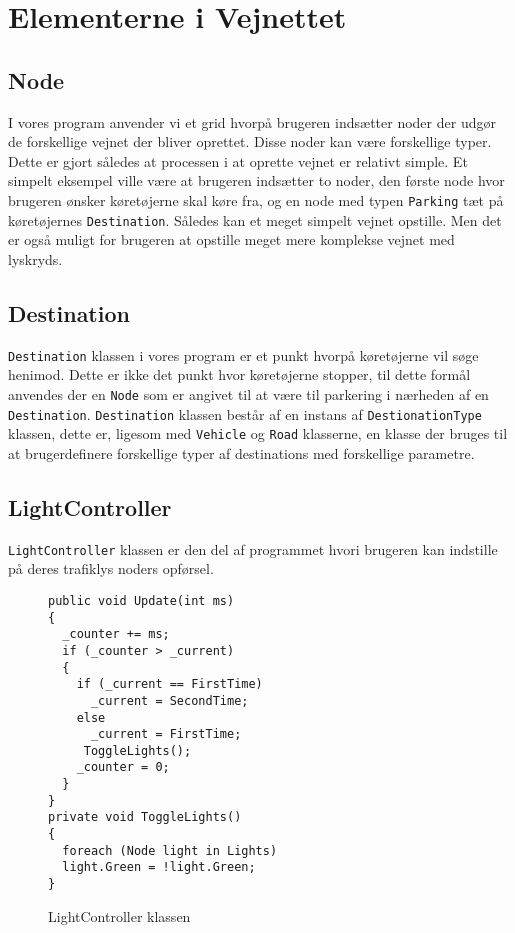 \section{Elementerne i Vejnettet}\label{ElementerVejnettet}
\subsection{Node}
I vores program anvender vi et grid hvorpå brugeren indsætter noder der udgør de forskellige vejnet der bliver oprettet. Disse noder kan være forskellige typer. Dette er gjort således at processen i at oprette vejnet er relativt simple. Et simpelt eksempel ville være at brugeren indsætter to noder, den første node hvor brugeren ønsker køretøjerne skal køre fra, og en node med typen \texttt{Parking} tæt på køretøjernes \texttt{Destination}. Således kan et meget simpelt vejnet opstille. Men det er også muligt for brugeren at opstille meget mere komplekse vejnet med lyskryds.

\subsection{Destination}
\texttt{Destination} klassen i vores program er et punkt hvorpå køretøjerne vil søge henimod. Dette er ikke det punkt hvor køretøjerne stopper, til dette formål anvendes der en \texttt{Node} som er angivet til at være til parkering i nærheden af en \texttt{Destination}. \texttt{Destination} klassen består af en instans af \texttt{DestionationType} klassen, dette er, ligesom med \texttt{Vehicle} og \texttt{Road} klasserne, en klasse der bruges til at brugerdefinere forskellige typer af destinations med forskellige parametre.

\subsection{LightController}
\texttt{LightController} klassen er den del af programmet hvori brugeren kan indstille på deres trafiklys noders opførsel.

\begin{figure}[H]
\begin{lstlisting}
public void Update(int ms)
{
  _counter += ms;
  if (_counter > _current)
  {
    if (_current == FirstTime)
      _current = SecondTime;
    else
      _current = FirstTime;
     ToggleLights();
    _counter = 0;
  }
}
private void ToggleLights()
{
  foreach (Node light in Lights)
  light.Green = !light.Green;
}
\end{lstlisting}
\caption{LightController klassen}\label{LightControllerKlassen}
\end{figure}

